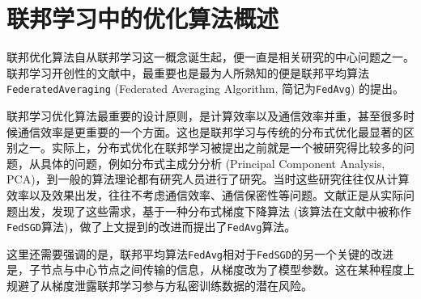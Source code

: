 \section{联邦学习中的优化算法概述}
\label{sec:chap2-overview}


联邦优化算法自从联邦学习这一概念诞生起，便一直是相关研究的中心问题之一。联邦学习开创性的文献\parencite{mcmahan2017fed_avg}中，最重要也是最为人所熟知的便是联邦平均算法\texttt{FederatedAveraging} (Federated Averaging Algorithm, 简记为\texttt{FedAvg}) 的提出。

联邦学习优化算法最重要的设计原则，是计算效率以及通信效率并重，甚至很多时候通信效率是更重要的一个方面。这也是联邦学习与传统的分布式优化最显著的区别之一。实际上，分布式优化在联邦学习被提出之前就是一个被研究得比较多的问题，从具体的问题，例如分布式主成分分析 (Principal Component Analysis, PCA)\cite{dist_pca_2014_nips}，到一般的算法理论\cite{Mangasarian_1995_parallel,boyd2011distributed}都有研究人员进行了研究。当时这些研究往往仅从计算效率以及效果出发，往往不考虑通信效率、通信保密性等问题。文献\parencite{mcmahan2017fed_avg}正是从实际问题出发，发现了这些需求，基于一种分布式梯度下降算法\cite{chen2016_revisit} (该算法在文献\parencite{mcmahan2017fed_avg}中被称作\texttt{FedSGD}算法)，做了上文提到的改进而提出了\texttt{FedAvg}算法。

这里还需要强调的是，联邦平均算法\texttt{FedAvg}相对于\texttt{FedSGD}的另一个关键的改进是，子节点与中心节点之间传输的信息，从梯度改为了模型参数。这在某种程度上规避了从梯度泄露联邦学习参与方私密训练数据\cite{zhu2019deep_leakage}的潜在风险。

